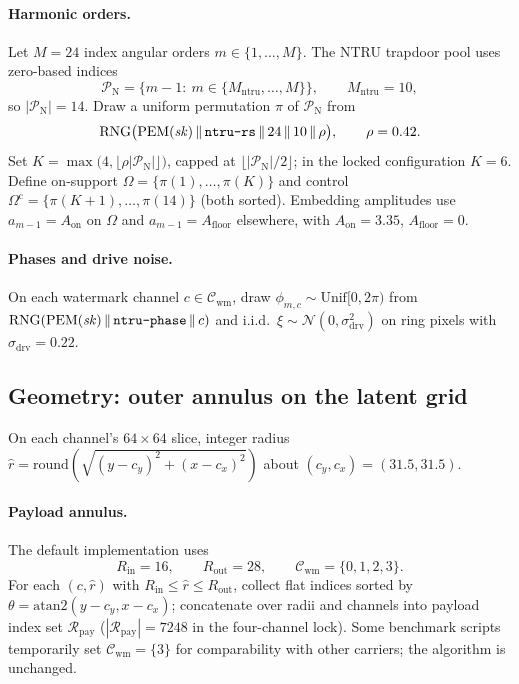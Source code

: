 \paragraph{Harmonic orders.}
Let $M=24$ index angular orders $m\in\{1,\ldots,M\}$.
The NTRU trapdoor pool uses zero-based indices
\[
\mathcal{P}_{\mathrm N}=\{m-1:\ m\in\{M_{\mathrm{ntru}},\ldots,M\}\},
\qquad M_{\mathrm{ntru}}=10,
\]
so $|\mathcal{P}_{\mathrm N}|=14$.
Draw a uniform permutation $\pi$ of $\mathcal{P}_{\mathrm N}$ from
\[
\mathrm{RNG}\bigl(\mathrm{PEM}(\mathit{sk})\,\|\,\text{\texttt{ntru-rs}}\,\|\,24\,\|\,10\,\|\,\rho\bigr),
\qquad \rho=0.42.
\]
Set $K=\max\bigl(4,\lfloor \rho|\mathcal{P}_{\mathrm N}|\rfloor\bigr)$, capped at
$\lfloor|\mathcal{P}_{\mathrm N}|/2\rfloor$; in the locked configuration $K=6$.
Define on-support $\Omega=\{\pi(1),\ldots,\pi(K)\}$ and control
$\Omega^{\mathrm c}=\{\pi(K+1),\ldots,\pi(14)\}$ (both sorted).
Embedding amplitudes use $a_{m-1}=A_{\mathrm{on}}$ on $\Omega$ and
$a_{m-1}=A_{\mathrm{floor}}$ elsewhere, with $A_{\mathrm{on}}=3.35$,
$A_{\mathrm{floor}}=0$.

\paragraph{Phases and drive noise.}
On each watermark channel $c\in\mathcal{C}_{\mathrm{wm}}$, draw
$\phi_{m,c}\sim\mathrm{Unif}[0,2\pi)$ from
$\mathrm{RNG}(\mathrm{PEM}(\mathit{sk})\,\|\,\text{\texttt{ntru-phase}}\,\|\,c)$ and
i.i.d.\ $\xi\sim\mathcal{N}(0,\sigma_{\mathrm{drv}}^2)$ on ring pixels with
$\sigma_{\mathrm{drv}}=0.22$.

\subsection{Geometry: outer annulus on the latent grid}
\label{sec:b3-geom}

On each channel's $64\times64$ slice, integer radius
$\hat r=\mathrm{round}(\sqrt{(y-c_y)^2+(x-c_x)^2})$ about $(c_y,c_x)=(31.5,31.5)$.

\paragraph{Payload annulus.}
The default implementation uses
\[
R_{\mathrm{in}}=16,\qquad R_{\mathrm{out}}=28,\qquad
\mathcal{C}_{\mathrm{wm}}=\{0,1,2,3\}.
\]
For each $(c,\hat r)$ with $R_{\mathrm{in}}\le\hat r\le R_{\mathrm{out}}$, collect
flat indices sorted by $\theta=\mathrm{atan2}(y-c_y,x-c_x)$; concatenate over radii
and channels into payload index set $\mathcal{R}_{\mathrm{pay}}$ ($|\mathcal{R}_{\mathrm{pay}}|=7248$ in the four-channel lock).
Some benchmark scripts temporarily set $\mathcal{C}_{\mathrm{wm}}=\{3\}$ for
comparability with other carriers; the algorithm is unchanged.

